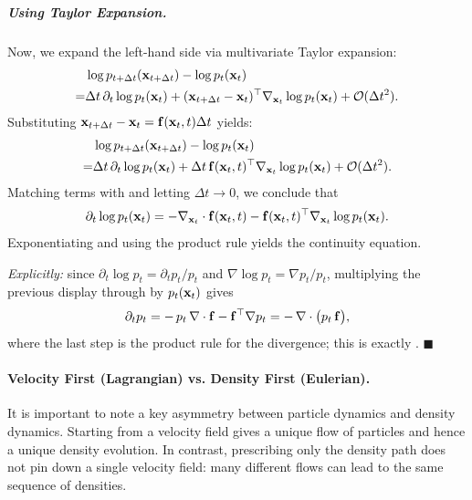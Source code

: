 \subparagraph{Using Taylor Expansion.}
Now, we expand the left-hand side via multivariate Taylor expansion:
\begin{align*}
    &\log p_{t+\Delta t}({\mathbf{x}}_{t+\Delta t}) 
    - \log p_t({\mathbf{x}}_t) 
    \\= &\Delta t\, \partial_t \log p_t({\mathbf{x}}_t) 
    + ({\mathbf{x}}_{t+\Delta t} - {\mathbf{x}}_t)^\top \nabla_{{\mathbf{x}}_t} \log p_t({\mathbf{x}}_t) 
    + \mathcal{O}(\Delta t^2).
\end{align*}
Substituting ${\mathbf{x}}_{t+\Delta t} - {\mathbf{x}}_t = {\mathbf{f}}({\mathbf{x}}_t, t)\Delta t$ yields:
\begin{align*}
    &\log p_{t+\Delta t}({\mathbf{x}}_{t+\Delta t}) 
    - \log p_t({\mathbf{x}}_t) 
    \\= & \Delta t\, \partial_t \log p_t({\mathbf{x}}_t) 
    + \Delta t\, {\mathbf{f}}({\mathbf{x}}_t, t)^\top \nabla_{{\mathbf{x}}_t} \log p_t({\mathbf{x}}_t) 
    + \mathcal{O}(\Delta t^2).
\end{align*}
Matching terms with  and letting $\Delta t \to 0$, we conclude that
\begin{equation*}
    \partial_t \log p_t({\mathbf{x}}_t) 
    = - \nabla_{{\mathbf{x}}_t} \cdot {\mathbf{f}}({\mathbf{x}}_t, t) 
    - {\mathbf{f}}({\mathbf{x}}_t, t)^\top \nabla_{{\mathbf{x}}_t} \log p_t({\mathbf{x}}_t).
\end{equation*}
Exponentiating and using the product rule yields the continuity equation.
\begin{nknote}
\noindent\textit{Explicitly:} since $\partial_t \log p_t = \partial_t p_t / p_t$ and $\nabla \log p_t = \nabla p_t / p_t$, multiplying the previous display through by $p_t({\mathbf{x}}_t)$ gives
\[
\partial_t p_t
= -\,p_t\,\nabla\cdot{\mathbf{f}} - {\mathbf{f}}^\top \nabla p_t
= -\,\nabla\cdot\big(p_t\,{\mathbf{f}}\big),
\]
where the last step is the product rule for the divergence; this is exactly . \hfill$\blacksquare$
\end{nknote}


\paragraph{Velocity First (Lagrangian) vs. Density First (Eulerian).}  It is important to note a key asymmetry between particle dynamics and density dynamics.  
Starting from a velocity field gives a unique flow of particles and hence a unique density evolution.  
In contrast, prescribing only the density path does not pin down a single velocity field: many different flows can lead to the same sequence of densities.
 

